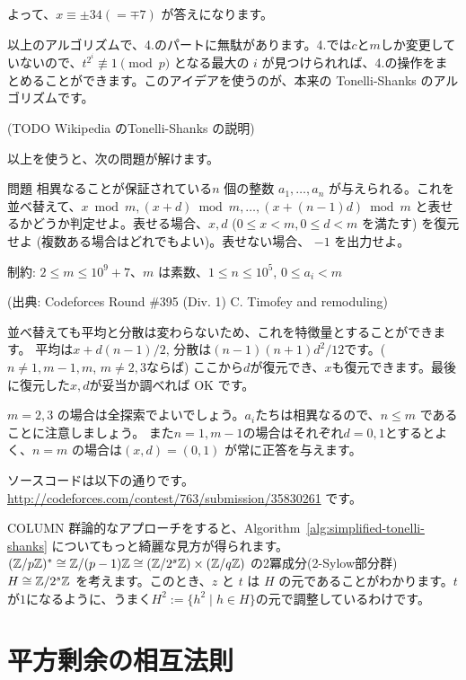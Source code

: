 \documentclass{jsarticle}
\begin{document}
よって、$x \equiv \pm 34 (=\mp 7)$ が答えになります。


以上のアルゴリズムで、4.のパートに無駄があります。4.では$c$と$m$しか変更していないので、$t^{2^i}\not \equiv 1 \pmod p$ となる最大の $i$ が見つけられれば、4.の操作をまとめることができます。このアイデアを使うのが、本来の Tonelli-Shanks のアルゴリズムです。

(TODO Wikipedia のTonelli-Shanks の説明)

 以上を使うと、次の問題が解けます。

 \begin{itembox}[l]{問題}
  相異なることが保証されている$n$ 個の整数 $a_1, \ldots, a_n$ が与えられる。これを並べ替えて、$x \bmod m, (x + d) \bmod m, \ldots, (x +(n - 1)d) \bmod m$ と表せるかどうか判定せよ。表せる場合、$x, d$ ($0 \le x < m, 0 \le d < m$ を満たす) を復元せよ (複数ある場合はどれでもよい)。表せない場合、 $-1$ を出力せよ。

  制約: $2 \le m \le 10^9 + 7$、$m$ は素数、$1 \le n \le 10^5$, $0 \le a_i < m$

  (出典: Codeforces Round \#395 (Div. 1) C. Timofey and remoduling)
 \end{itembox}
 並べ替えても平均と分散は変わらないため、これを特徴量とすることができます。
 平均は$x + d(n - 1) / 2$, 分散は$(n-1)(n+1)d^2/12$です。($n \neq 1, m-1,m$, $m \neq 2, 3$ならば) ここから$d$が復元でき、$x$も復元できます。最後に復元した$x, d$が妥当か調べれば OK です。

 $m = 2, 3$ の場合は全探索でよいでしょう。$a_i$たちは相異なるので、$n \le m$ であることに注意しましょう。
 また$n = 1, m-1$の場合はそれぞれ$d = 0, 1$とするとよく、$n = m$ の場合は$(x, d) = (0, 1)$ が常に正答を与えます。

 ソースコードは以下の通りです。\url{http://codeforces.com/contest/763/submission/35830261} です。
 

\begin{itembox}[l]{COLUMN}
 群論的なアプローチをすると、Algorithm~\ref{alg:simplified-tonelli-shanks} についてもっと綺麗な見方が得られます。
$(\mathbb{Z}/p\mathbb{Z})^* \cong \mathbb{Z}/(p-1)\mathbb{Z} \cong (\mathbb{Z}/2^s\mathbb{Z}) \times (\mathbb{Z}/q\mathbb{Z})$ の2冪成分(2-Sylow部分群) $H \cong \mathbb{Z}/2^s\mathbb{Z}$ を考えます。このとき、$z$ と $t$ は $H$ の元であることがわかります。$t$が$1$になるように、うまく$H^2 := \{h^2 \mid h \in H\}$の元で調整しているわけです。
\end{itembox}
 \section{平方剰余の相互法則}
\end{document}
